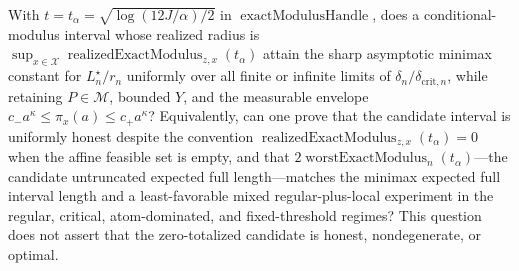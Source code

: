 With \(t=t_\alpha=\sqrt{\log(12J/\alpha)/2}\) in \(\operatorname{exactModulusHandle}\), does a conditional-modulus interval whose realized radius is \(\sup_{x\in\mathcal X}\operatorname{realizedExactModulus}_{z,x}(t_\alpha)\) attain the sharp asymptotic minimax constant for \(L_n^\star/r_n\) uniformly over all finite or infinite limits of \(\delta_n/\delta_{\mathrm{crit},n}\), while retaining \(P\in\mathcal M\), bounded \(Y\), and the measurable envelope \(c_-a^\kappa\leq\pi_x(a)\leq c_+a^\kappa\)?  Equivalently, can one prove that the candidate interval is uniformly honest despite the convention \(\operatorname{realizedExactModulus}_{z,x}(t_\alpha)=0\) when the affine feasible set is empty, and that \(2\operatorname{worstExactModulus}_n(t_\alpha)\)---the candidate untruncated expected full length---matches the minimax expected full interval length and a least-favorable mixed regular-plus-local experiment in the regular, critical, atom-dominated, and fixed-threshold regimes?  This question does not assert that the zero-totalized candidate is honest, nondegenerate, or optimal.